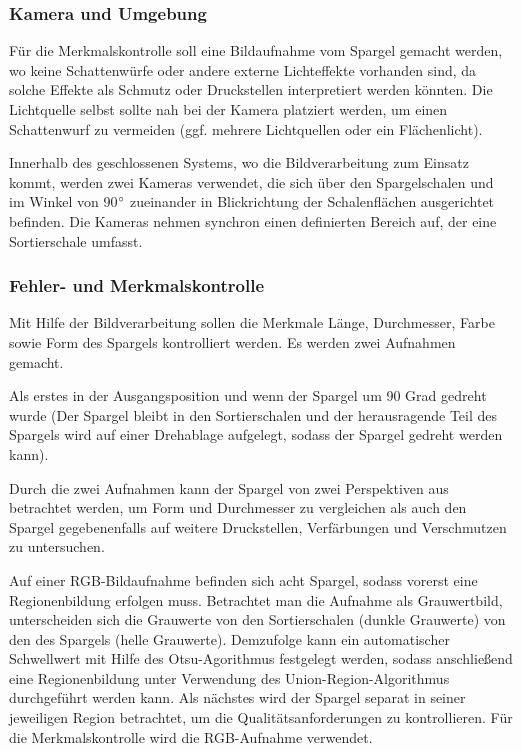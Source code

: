 \documentclass{ezb}
\begin{document}
\subsubsection*{Kamera und Umgebung}
Für die Merkmalskontrolle soll eine Bildaufnahme vom Spargel gemacht werden, wo keine Schattenwürfe oder andere externe Lichteffekte vorhanden sind, da solche Effekte als Schmutz oder Druckstellen interpretiert werden könnten. Die Lichtquelle selbst sollte nah bei der Kamera platziert werden, um einen Schattenwurf zu vermeiden (ggf. mehrere Lichtquellen oder ein Flächenlicht). 

Innerhalb des geschlossenen Systems, wo die Bildverarbeitung zum Einsatz kommt, werden zwei Kameras verwendet, die sich über den Spargelschalen und im Winkel von 90$\degree$ zueinander in Blickrichtung der Schalenflächen ausgerichtet befinden. Die Kameras nehmen synchron einen definierten Bereich auf, der eine Sortierschale umfasst.

\subsubsection*{Fehler- und Merkmalskontrolle}
Mit Hilfe der Bildverarbeitung sollen die Merkmale Länge, Durchmesser, Farbe sowie Form des Spargels kontrolliert werden. Es werden zwei Aufnahmen gemacht.

Als erstes in der Ausgangsposition und wenn der Spargel um 90 Grad gedreht wurde (Der Spargel bleibt in den Sortierschalen und der herausragende Teil des Spargels wird auf einer Drehablage aufgelegt, sodass der Spargel gedreht werden kann).

Durch die zwei Aufnahmen kann der Spargel von zwei Perspektiven aus betrachtet werden, um Form und Durchmesser zu vergleichen als auch den Spargel gegebenenfalls auf weitere Druckstellen, Verfärbungen und Verschmutzen zu untersuchen.

Auf einer RGB-Bildaufnahme befinden sich acht Spargel, sodass vorerst eine Regionenbildung erfolgen muss. Betrachtet man die Aufnahme als Grauwertbild, unterscheiden sich die Grauwerte von den Sortierschalen (dunkle Grauwerte) von den des Spargels (helle Grauwerte). Demzufolge kann ein automatischer Schwellwert mit Hilfe des Otsu-Agorithmus festgelegt werden, sodass anschließend eine Regionenbildung unter Verwendung des Union-Region-Algorithmus durchgeführt werden kann. Als nächstes wird der Spargel separat in seiner jeweiligen Region betrachtet, um die Qualitätsanforderungen zu kontrollieren. Für die Merkmalskontrolle wird die RGB-Aufnahme verwendet.
\end{document}
